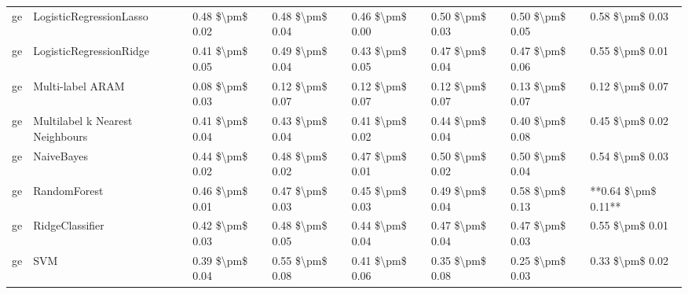 \begin{tabular}{llllllll}
      ge &         LogisticRegressionLasso & 0.48 \$\textbackslash pm\$ 0.02 &           0.48 \$\textbackslash pm\$ 0.04 &       0.46 \$\textbackslash pm\$ 0.00 &        0.50 \$\textbackslash pm\$ 0.03 &                         0.50 \$\textbackslash pm\$ 0.05 &     0.58 \$\textbackslash pm\$ 0.03 \\
      ge &         LogisticRegressionRidge & 0.41 \$\textbackslash pm\$ 0.05 &           0.49 \$\textbackslash pm\$ 0.04 &       0.43 \$\textbackslash pm\$ 0.05 &        0.47 \$\textbackslash pm\$ 0.04 &                         0.47 \$\textbackslash pm\$ 0.06 &     0.55 \$\textbackslash pm\$ 0.01 \\
      ge &                Multi-label ARAM & 0.08 \$\textbackslash pm\$ 0.03 &           0.12 \$\textbackslash pm\$ 0.07 &       0.12 \$\textbackslash pm\$ 0.07 &        0.12 \$\textbackslash pm\$ 0.07 &                         0.13 \$\textbackslash pm\$ 0.07 &     0.12 \$\textbackslash pm\$ 0.07 \\
      ge & Multilabel k Nearest Neighbours & 0.41 \$\textbackslash pm\$ 0.04 &           0.43 \$\textbackslash pm\$ 0.04 &       0.41 \$\textbackslash pm\$ 0.02 &        0.44 \$\textbackslash pm\$ 0.04 &                         0.40 \$\textbackslash pm\$ 0.08 &     0.45 \$\textbackslash pm\$ 0.02 \\
      ge &                      NaiveBayes & 0.44 \$\textbackslash pm\$ 0.02 &           0.48 \$\textbackslash pm\$ 0.02 &       0.47 \$\textbackslash pm\$ 0.01 &        0.50 \$\textbackslash pm\$ 0.02 &                         0.50 \$\textbackslash pm\$ 0.04 &     0.54 \$\textbackslash pm\$ 0.03 \\
      ge &                    RandomForest & 0.46 \$\textbackslash pm\$ 0.01 &           0.47 \$\textbackslash pm\$ 0.03 &       0.45 \$\textbackslash pm\$ 0.03 &        0.49 \$\textbackslash pm\$ 0.04 &                         0.58 \$\textbackslash pm\$ 0.13 & **0.64 \$\textbackslash pm\$ 0.11** \\
      ge &                 RidgeClassifier & 0.42 \$\textbackslash pm\$ 0.03 &           0.48 \$\textbackslash pm\$ 0.05 &       0.44 \$\textbackslash pm\$ 0.04 &        0.47 \$\textbackslash pm\$ 0.04 &                         0.47 \$\textbackslash pm\$ 0.03 &     0.55 \$\textbackslash pm\$ 0.01 \\
      ge &                             SVM & 0.39 \$\textbackslash pm\$ 0.04 &           0.55 \$\textbackslash pm\$ 0.08 &       0.41 \$\textbackslash pm\$ 0.06 &        0.35 \$\textbackslash pm\$ 0.08 &                         0.25 \$\textbackslash pm\$ 0.03 &     0.33 \$\textbackslash pm\$ 0.02 \\

\end{tabular}
